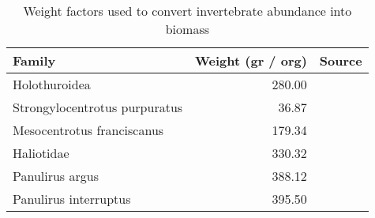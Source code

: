 \begin{table}[H]

\caption{\label{tab:w_fact}Weight factors used to convert invertebrate abundance into biomass}
\centering
\begin{tabular}[t]{lrl}
\toprule
Family & Weight (gr / org) & Source\\
\midrule
Holothuroidea & 280.00 & \cite{chavez2011stock}\\
Strongylocentrotus purpuratus & 36.87 & \cite{smith2021variation,dof_erizo}\\
Mesocentrotus franciscanus & 179.34 & \cite{leus2014framework,dof_erizo}\\
Haliotidae & 330.32 & \cite{rossetto2013reproductive,dof_abulon}\\
Panulirus argus & 388.12 & \cite{neilson2011assessment,dof_langosta}\\
\addlinespace
Panulirus interruptus & 395.50 & \cite{murray1996analysis,dof_langosta}\\
\bottomrule
\end{tabular}
\end{table}
